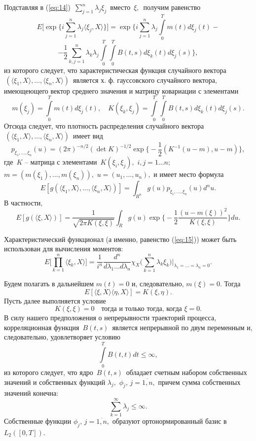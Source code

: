 \documentclass [12pt]{report}
\begin{document}
Подставляя в (\ref{eq:14}) $\,\sum\limits_{j=1}^n\lambda_j\xi_j\,$ вместо $\,\xi,\,$
получим равенство
$$E\Big[\exp\Big\{i\sum\limits_{j=1}^n\lambda_j\langle\xi_j,X\rangle\Big\}\Big]=
\exp\Big\{
i \sum\limits_{j=1}^n \lambda_j\int\limits_0^T m(t)d\xi_j(t)-$$
\begin{equation}\label{eq:15}
-\frac{1}{2}\sum\limits_{k,j=1}^n\lambda_k\lambda_j\int\limits_0^T\int\limits_0^T
B(t,s)d\xi_k(t)d\xi_j(s)\Big\},
\end{equation}
из которого следует, что характеристическая функция случайного вектора
$\,(\langle\xi_1,X\rangle,\ldots,\langle\xi_n,X\rangle)\,$
является х. ф. гауссовского случайного вектора,
имеющеющего вектор среднего значения и матрицу ковариации с элементами
$$m(\xi_j)=\int\limits_0^T m(t)d\xi_j(t),\quad
K(\xi_k,\xi_j)=\int\limits_0^T\int\limits_0^T
B(t,s)d\xi_k(t)d\xi_j(s). $$
Отсюда следует, что плотность распределения случайного вектора
$\,(\langle\xi_1,X\rangle,\ldots,\langle\xi_n,X\rangle)\,$
имеет вид
$$p_{\xi_1,...,\xi_n}(u)=
(2\pi)^{-n/2}(\det K)^{-1/2}\exp\Big\{-\frac{1}{2}(K^{-1}(u-m),u-m)\Big\},$$
где $\,K$ -- матрица с элементами $\, K(\xi_i,\xi_j), \,\,i,j=1...n;$
$m=(m(\xi_1),...,m(\xi_n)),$ $u=(u_1,\ldots,u_n),$ и имеет место формула
$$E[g(\langle\xi_1,X\rangle,...,\langle\xi_n,X\rangle)]=
\int_{R^n}g(u)p_{\xi_1,...,\xi_n}(u)d^n u.$$
В частности,
$$E[g(\langle\xi,X\rangle)]=
\frac{1}{\sqrt{2\pi K(\xi,\xi)}}\int_{R}g(u)
\exp\Big\{-\frac{1}{2}\frac{(u-m(\xi))^2}{K(\xi,\xi)}\Big\}du.$$

Характеристический функционал (а именно, равенство (\ref{eq:15})) может быть
использован для вычисления моментов:
\begin{equation}\label{eq:20}
E\Big[\prod\limits_{k=1}^{n}\langle\xi_k,X \rangle \Big]=
\frac{1}{i^n}\frac{d^{n}}{d\lambda_1\ldots d\lambda_{n}}
\chi_X \Big(\sum\limits_{k=1}^n\lambda_k\xi_k\Big)
\Big|_{\lambda_1=\ldots =\lambda_{n}=0}.
\end{equation}

Будем полагать в дальнейшем $m(t)=0$ и, следовательно, $m(\xi)=0.$
Тогда
$$E[\langle\xi,X\rangle\langle\eta,X\rangle]=K(\xi,\eta).$$
Пусть далее выполняется условие
\begin{equation}\label{eq:21}
K(\xi,\xi)=0 \quad \text{тогда и только тогда, когда} \,\, \xi=0.
\end{equation}
В силу нашего предположения о непрерывности траекторий процесса,
корреляционная функция $\,B(t,s)\,$ является непрерывной по двум переменным
и, следовательно, удовлетворяет условию
$$
\int\limits_0^T B(t,t)dt\leq\infty,
$$
из которого следует, что ядро $\,B(t,s)\,$ обладает
счетным набором собственных значений и собственных функций
$\lambda_j,$ $\phi_j, \, j=\overline{1,n},$
причем сумма собственных значений конечна:
$$
\sum\limits_{k=1}^{\infty}\lambda_j\leq \infty.
$$
Собственные функции $\phi_j, \, j=\overline{1,n},$ образуют
ортонормированный базис в $L_2([0,T]).$
\end{document}
